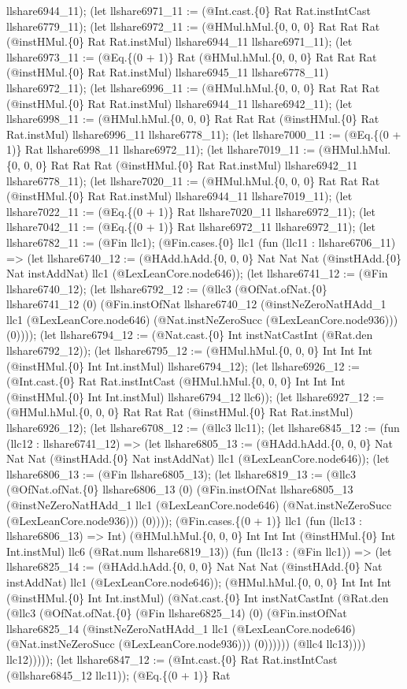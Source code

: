 \documentclass[11pt]{article}
\begin{document}
llshare6944\_11); (let llshare6971\_11 := (@Int.cast.\{0\} Rat Rat.instIntCast llshare6779\_11); (let llshare6972\_11 := (@HMul.hMul.\{0, 0, 0\} Rat Rat Rat (@instHMul.\{0\} Rat Rat.instMul) llshare6944\_11 llshare6971\_11); (let llshare6973\_11 := (@Eq.\{(0 + 1)\} Rat (@HMul.hMul.\{0, 0, 0\} Rat Rat Rat (@instHMul.\{0\} Rat Rat.instMul) llshare6945\_11 llshare6778\_11) llshare6972\_11); (let llshare6996\_11 := (@HMul.hMul.\{0, 0, 0\} Rat Rat Rat (@instHMul.\{0\} Rat Rat.instMul) llshare6944\_11 llshare6942\_11); (let llshare6998\_11 := (@HMul.hMul.\{0, 0, 0\} Rat Rat Rat (@instHMul.\{0\} Rat Rat.instMul) llshare6996\_11 llshare6778\_11); (let llshare7000\_11 := (@Eq.\{(0 + 1)\} Rat llshare6998\_11 llshare6972\_11); (let llshare7019\_11 := (@HMul.hMul.\{0, 0, 0\} Rat Rat Rat (@instHMul.\{0\} Rat Rat.instMul) llshare6942\_11 llshare6778\_11); (let llshare7020\_11 := (@HMul.hMul.\{0, 0, 0\} Rat Rat Rat (@instHMul.\{0\} Rat Rat.instMul) llshare6944\_11 llshare7019\_11); (let llshare7022\_11 := (@Eq.\{(0 + 1)\} Rat llshare7020\_11 llshare6972\_11); (let llshare7042\_11 := (@Eq.\{(0 + 1)\} Rat llshare6972\_11 llshare6972\_11); (let llshare6782\_11 := (@Fin llc1); (@Fin.cases.\{0\} llc1 (fun (llc11 : llshare6706\_11) => (let llshare6740\_12 := (@HAdd.hAdd.\{0, 0, 0\} Nat Nat Nat (@instHAdd.\{0\} Nat instAddNat) llc1 (@LexLeanCore.node646)); (let llshare6741\_12 := (@Fin llshare6740\_12); (let llshare6792\_12 := (@llc3 (@OfNat.ofNat.\{0\} llshare6741\_12 (0) (@Fin.instOfNat llshare6740\_12 (@instNeZeroNatHAdd\_1 llc1 (@LexLeanCore.node646) (@Nat.instNeZeroSucc (@LexLeanCore.node936))) (0)))); (let llshare6794\_12 := (@Nat.cast.\{0\} Int instNatCastInt (@Rat.den llshare6792\_12)); (let llshare6795\_12 := (@HMul.hMul.\{0, 0, 0\} Int Int Int (@instHMul.\{0\} Int Int.instMul) llshare6794\_12); (let llshare6926\_12 := (@Int.cast.\{0\} Rat Rat.instIntCast (@HMul.hMul.\{0, 0, 0\} Int Int Int (@instHMul.\{0\} Int Int.instMul) llshare6794\_12 llc6)); (let llshare6927\_12 := (@HMul.hMul.\{0, 0, 0\} Rat Rat Rat (@instHMul.\{0\} Rat Rat.instMul) llshare6926\_12); (let llshare6708\_12 := (@llc3 llc11); (let llshare6845\_12 := (fun (llc12 : llshare6741\_12) => (let llshare6805\_13 := (@HAdd.hAdd.\{0, 0, 0\} Nat Nat Nat (@instHAdd.\{0\} Nat instAddNat) llc1 (@LexLeanCore.node646)); (let llshare6806\_13 := (@Fin llshare6805\_13); (let llshare6819\_13 := (@llc3 (@OfNat.ofNat.\{0\} llshare6806\_13 (0) (@Fin.instOfNat llshare6805\_13 (@instNeZeroNatHAdd\_1 llc1 (@LexLeanCore.node646) (@Nat.instNeZeroSucc (@LexLeanCore.node936))) (0)))); (@Fin.cases.\{(0 + 1)\} llc1 (fun (llc13 : llshare6806\_13) => Int) (@HMul.hMul.\{0, 0, 0\} Int Int Int (@instHMul.\{0\} Int Int.instMul) llc6 (@Rat.num llshare6819\_13)) (fun (llc13 : (@Fin llc1)) => (let llshare6825\_14 := (@HAdd.hAdd.\{0, 0, 0\} Nat Nat Nat (@instHAdd.\{0\} Nat instAddNat) llc1 (@LexLeanCore.node646)); (@HMul.hMul.\{0, 0, 0\} Int Int Int (@instHMul.\{0\} Int Int.instMul) (@Nat.cast.\{0\} Int instNatCastInt (@Rat.den (@llc3 (@OfNat.ofNat.\{0\} (@Fin llshare6825\_14) (0) (@Fin.instOfNat llshare6825\_14 (@instNeZeroNatHAdd\_1 llc1 (@LexLeanCore.node646) (@Nat.instNeZeroSucc (@LexLeanCore.node936))) (0)))))) (@llc4 llc13)))) llc12))))); (let llshare6847\_12 := (@Int.cast.\{0\} Rat Rat.instIntCast (@llshare6845\_12 llc11)); (@Eq.\{(0 + 1)\} Rat 
\end{document}
